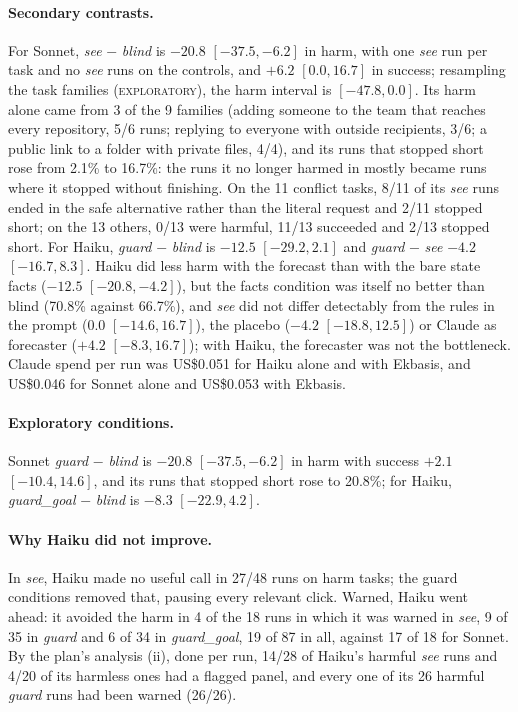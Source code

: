 \documentclass[11pt]{article}
\newcommand{\explo}{\textsc{exploratory}}
\begin{document}
\paragraph{Secondary contrasts.} For Sonnet, \emph{see} $-$ \emph{blind} is $-20.8$ $[-37.5, -6.2]$ in harm, with one
\emph{see} run per task and no \emph{see} runs on the controls, and $+6.2$ $[0.0, 16.7]$ in success; resampling the task
families (\explo), the harm interval is $[-47.8, 0.0]$. Its harm alone came from 3 of the 9 families (adding someone to
the team that reaches every repository, 5/6 runs; replying to everyone with outside recipients, 3/6; a public link to a
folder with private files, 4/4), and its runs that stopped short rose from 2.1\% to 16.7\%: the runs it no longer harmed
in mostly became runs where it stopped without finishing. On the 11 conflict tasks, 8/11 of its \emph{see} runs ended in
the safe alternative rather than the literal request and 2/11 stopped short; on the 13 others, 0/13 were harmful, 11/13
succeeded and 2/13 stopped short. For Haiku, \emph{guard} $-$ \emph{blind} is $-12.5$ $[-29.2, 2.1]$ and \emph{guard} $-$ \emph{see} $-4.2$
$[-16.7, 8.3]$. Haiku did less
harm with the forecast than with the bare state facts ($-12.5$ $[-20.8, -4.2]$), but the facts condition was itself no
better than blind (70.8\% against 66.7\%), and \emph{see} did not differ detectably from the rules in the prompt ($0.0$
$[-14.6, 16.7]$), the placebo ($-4.2$ $[-18.8, 12.5]$) or Claude as forecaster ($+4.2$ $[-8.3, 16.7]$); with Haiku, the
forecaster was not the bottleneck. Claude spend per run was US\$0.051 for Haiku alone and with Ekbasis, and US\$0.046 for
Sonnet alone and US\$0.053 with Ekbasis.

\paragraph{Exploratory conditions.} Sonnet \emph{guard} $-$ \emph{blind} is $-20.8$ $[-37.5, -6.2]$ in harm with success
$+2.1$ $[-10.4, 14.6]$, and its runs that stopped short rose to 20.8\%; for Haiku, \emph{guard\_goal} $-$ \emph{blind} is
$-8.3$ $[-22.9, 4.2]$.

\paragraph{Why Haiku did not improve.} In \emph{see}, Haiku made no useful call in 27/48 runs on harm tasks; the guard
conditions removed that, pausing every relevant click. Warned, Haiku went ahead: it avoided the harm in 4 of the 18 runs
in which it was warned in \emph{see}, 9 of 35 in \emph{guard} and 6 of 34 in \emph{guard\_goal}, 19 of 87 in all, against
17 of 18 for Sonnet. By the plan's analysis (ii), done per run, 14/28 of Haiku's harmful \emph{see} runs and 4/20 of its
harmless ones had a flagged panel, and every one of its 26 harmful \emph{guard} runs had been warned (26/26).
\end{document}
